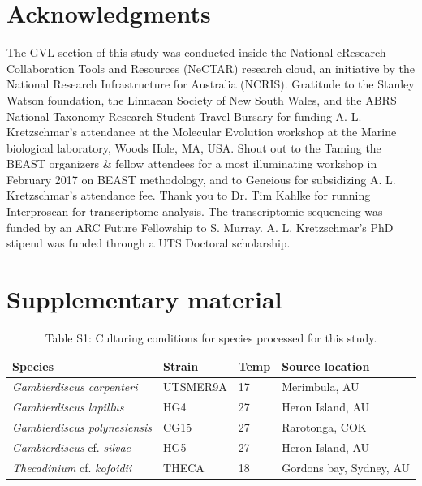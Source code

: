 \documentclass[12pt]{article}
\begin{document}
\section{Acknowledgments}
The GVL section of this study was conducted inside the National eResearch Collaboration Tools and Resources (NeCTAR) research cloud, an initiative by the National Research Infrastructure for Australia (NCRIS).
Gratitude to the Stanley Watson foundation, the Linnaean Society of New South Wales, and the ABRS National Taxonomy Research Student Travel Bursary for funding A. L. Kretzschmar's attendance at the Molecular Evolution workshop at the Marine biological laboratory, Woods Hole, MA, USA.
Shout out to the Taming the BEAST organizers \& fellow attendees for a most illuminating workshop in February 2017 on BEAST methodology, and to Geneious for subsidizing A. L. Kretzschmar's attendance fee.
Thank you to Dr. Tim Kahlke for running Interproscan for transcriptome analysis. 
The transcriptomic sequencing was funded by an ARC Future Fellowship to S. Murray.
A. L. Kretzschmar's PhD stipend was funded through a UTS Doctoral scholarship.
\section{Supplementary material}
\FloatBarrier
\begin{table}
\caption{Table S1: Culturing conditions for species processed for this study.}
\begin{tabular}{ | p{3cm} | p{2.5cm} | p{1.5cm} | p{5.3cm} |}
\hline
\textbf{Species} & \textbf{Strain}& \textbf{Temp} & \textbf{Source location} \\
\hline
\textit{Gambierdiscus carpenteri}&UTSMER9A&17&Merimbula, AU\\
\hline
\textit{Gambierdiscus lapillus}&HG4&27&Heron Island, AU\\
\hline
\textit{Gambierdiscus polynesiensis}&CG15&27&Rarotonga, COK\\
\hline
\textit{Gambierdiscus} cf. \textit{silvae}&HG5&27&Heron Island, AU\\
\hline
\textit{Thecadinium} cf. \emph{kofoidii}&THECA&18&Gordons bay, Sydney, AU\\
\hline
\end{tabular}
\end{table}
\FloatBarrier
\end{document}
